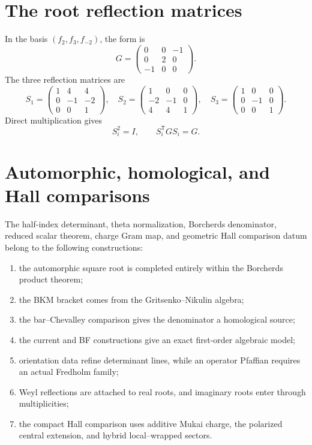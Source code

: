 \chapter{The root reflection matrices}
In the basis $(f_2,f_3,f_{-2})$, the form is
\[
 G=\begin{pmatrix}0&0&-1\\0&2&0\\-1&0&0\end{pmatrix}.
\]
The three reflection matrices are
\[
 S_1=\begin{pmatrix}1&4&4\\0&-1&-2\\0&0&1\end{pmatrix},\quad
 S_2=\begin{pmatrix}1&0&0\\-2&-1&0\\4&4&1\end{pmatrix},\quad
 S_3=\begin{pmatrix}1&0&0\\0&-1&0\\0&0&1\end{pmatrix}.
\]
Direct multiplication gives
\[
 S_i^2=I,
 \qquad S_i^{\mathsf T}GS_i=G.
\]

\chapter{Automorphic, homological, and Hall comparisons}
The half-index determinant, theta normalization, Borcherds denominator, reduced scalar theorem, charge Gram map, and geometric Hall comparison datum belong to the following constructions:
\begin{enumerate}
\item the automorphic square root is completed entirely within the Borcherds product theorem;
\item the BKM bracket comes from the Gritsenko--Nikulin algebra;
\item the bar--Chevalley comparison gives the denominator a homological source;
\item the current and BF constructions give an exact first-order algebraic model;
\item orientation data refine determinant lines, while an operator Pfaffian requires an actual Fredholm family;
\item Weyl reflections are attached to real roots, and imaginary roots enter through multiplicities;
\item the compact Hall comparison uses additive Mukai charge, the polarized central extension, and hybrid local--wrapped sectors.
\end{enumerate}
